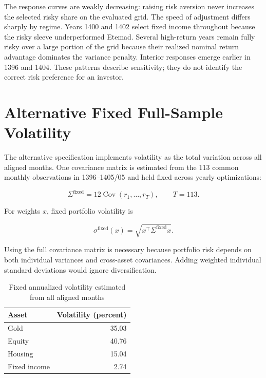\documentclass[11pt,a4paper]{article}
\newcommand{\Cov}{\operatorname{Cov}}
\begin{document}
The response curves are weakly decreasing: raising risk aversion never increases the selected
risky share on the evaluated grid. The speed of adjustment differs sharply by regime. Years 1400
and 1402 select fixed income throughout because the risky sleeve underperformed Etemad. Several
high-return years remain fully risky over a large portion of the grid because their realized
nominal return advantage dominates the variance penalty. Interior responses emerge earlier in
1396 and 1404. These patterns describe sensitivity; they do not identify the correct risk
preference for an investor.

\section{Alternative Fixed Full-Sample Volatility}

The alternative specification implements volatility as the total variation across all aligned
months. One covariance matrix is estimated from the 113 common monthly observations in
1396--1405/05 and held fixed across yearly optimizations:

\begin{equation}
\Sigma^{\text{fixed}}=12\Cov(r_1,\ldots,r_T),
\qquad T=113.
\end{equation}

For weights $x$, fixed portfolio volatility is

\begin{equation}
\sigma^{\text{fixed}}(x)
=\sqrt{x^\top\Sigma^{\text{fixed}}x}.
\end{equation}

Using the full covariance matrix is necessary because portfolio risk depends on both individual
variances and cross-asset covariances. Adding weighted individual standard deviations would ignore
diversification.

\begin{table}[ht]
\centering
\caption{Fixed annualized volatility estimated from all aligned months}
\begin{tabular}{lr}
\toprule
Asset & Volatility (percent) \\
\midrule
Gold & 35.03 \\
Equity & 40.76 \\
Housing & 15.04 \\
Fixed income & 2.74 \\
\bottomrule
\end{tabular}
\end{table}
\end{document}
